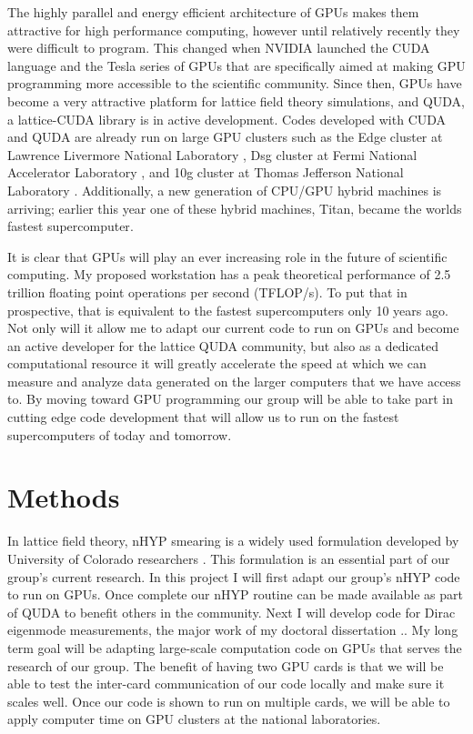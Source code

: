\documentclass[11pt]{article}
\begin{document}
 The highly parallel and energy efficient architecture of GPUs makes them attractive for high performance computing, however until relatively recently they were difficult to program.
 This changed when NVIDIA launched the CUDA language and the Tesla series of GPUs that are specifically aimed at making GPU programming more accessible to the scientific community.
  Since then, GPUs have become a very attractive platform for lattice field theory simulations, and QUDA, a lattice-CUDA library \cite{QUDA1,QUDA2,QUDA3} is in active development.
   Codes developed with CUDA and QUDA are already run on large GPU clusters such as the Edge cluster at Lawrence Livermore National Laboratory \cite{Edge}, Dsg cluster at Fermi National Accelerator Laboratory \cite{Dsg}, and 10g cluster at Thomas Jefferson National Laboratory \cite{10g}.
   Additionally, a new generation of CPU/GPU hybrid machines is arriving; earlier this year one of these hybrid machines, Titan, became the worlds fastest supercomputer\cite{Titan}.

  It is clear that GPUs will play an ever increasing role in the future of scientific computing.
  My proposed workstation has a peak theoretical performance of 2.5 trillion floating point operations per second (TFLOP/s).
  To put that in prospective, that is equivalent to the fastest supercomputers only 10 years ago.
  Not only will it allow me to adapt our current code to run on GPUs and become an active developer for the lattice QUDA community, but also as a dedicated computational resource it will greatly accelerate the speed at which we can measure and analyze data generated on the larger computers that we have access to.
  By moving toward GPU programming our group will be able to take part in cutting edge code development that will allow us to run on the fastest supercomputers of today and tomorrow.
    
   \section*{Methods} %
  In lattice field theory, nHYP smearing is a widely used formulation developed by University of Colorado researchers \cite{nHYP1,nHYP2,nHYP3}.
  This formulation is an essential part of our group's current research.
  In this project I will first adapt our group's nHYP code to run on GPUs.
  Once complete our nHYP routine can be made available as part of QUDA to benefit others in the community.
  Next I will develop code for Dirac eigenmode measurements, the major work of my doctoral dissertation \cite{paper1, paper2, paper3}..
  My long term goal will be adapting large-scale computation code on GPUs that serves the research of our group.
 The benefit of having two GPU cards is that we will be able to test the inter-card communication of our code locally and make sure it scales well.
  Once our code is shown to run on multiple cards, we will be able to apply computer time on GPU clusters at the national laboratories.
    
\end{document}
